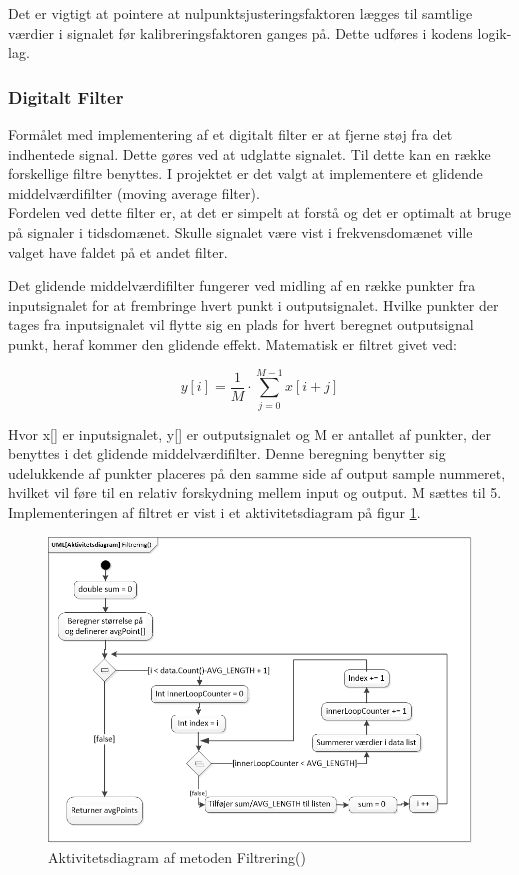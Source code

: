 Det er vigtigt at pointere at nulpunktsjusteringsfaktoren lægges til samtlige værdier i signalet før kalibreringsfaktoren ganges på. Dette udføres i kodens logik-lag.
 
\subsubsection{Digitalt Filter}
\cite{DSBsoft} Formålet med implementering af et digitalt filter er at fjerne støj fra det indhentede signal. Dette gøres ved at udglatte signalet. Til dette kan en række forskellige filtre benyttes. I projektet er det valgt at implementere et glidende middelværdifilter (moving average filter).\\ Fordelen ved dette filter er, at det er simpelt at forstå og det er optimalt at bruge på signaler i tidsdomænet. Skulle signalet være vist i frekvensdomænet ville valget have faldet på et andet filter. 

Det glidende middelværdifilter fungerer ved midling af en række punkter fra inputsignalet for at frembringe hvert punkt i outputsignalet. Hvilke punkter der tages fra inputsignalet vil flytte sig en plads for hvert beregnet outputsignal punkt, heraf kommer den glidende effekt. Matematisk er filtret givet ved:
\begin{ceqn}
\begin{equation}
y[i]=\frac{1}{M}\cdot\sum\limits_{j=0}^{M-1} x[i+j]
\end{equation}
\end{ceqn}

Hvor x[] er inputsignalet, y[] er outputsignalet og M er antallet af punkter, der benyttes i det glidende middelværdifilter. Denne beregning benytter sig udelukkende af punkter placeres på den samme side af output sample nummeret, hvilket vil føre til en relativ forskydning mellem input og output. M sættes til 5. Implementeringen af filtret er vist i et aktivitetsdiagram på figur \ref{fig:Aktivitetsdiagram_Digitalt_filter}.

\begin{figure}[H]
	\centering
	\includegraphics[width=1.0\textwidth]{Figurer/AktFiltrering}
	\caption{Aktivitetsdiagram af metoden Filtrering()}
	\label{fig:Aktivitetsdiagram_Digitalt_filter}
\end{figure}


